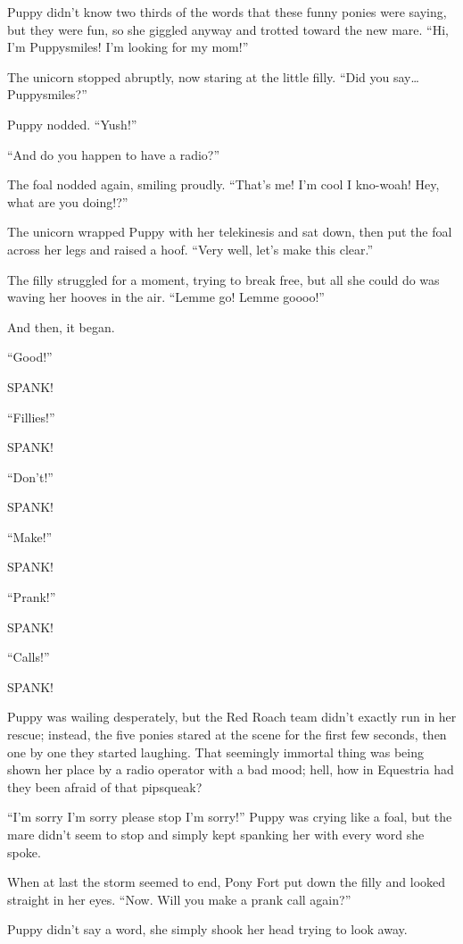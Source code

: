 Puppy didn't know two thirds of the words that these funny ponies were saying, but they were fun, so she giggled anyway and trotted toward the new mare. ``Hi, I'm Puppysmiles! I'm looking for my mom!''

The unicorn stopped abruptly, now staring at the little filly. ``Did you say\dots Puppysmiles?''

Puppy nodded. ``Yush!''

``And do you happen to have a radio?''

The foal nodded again, smiling proudly. ``That's me! I'm cool I kno-woah! Hey, what are you doing!?''

The unicorn wrapped Puppy with her telekinesis and sat down, then put the foal across her legs and raised a hoof. ``Very well, let's make this clear.''

The filly struggled for a moment, trying to break free, but all she could do was waving her hooves in the air. ``Lemme go! Lemme goooo!''

And then, it began.

``Good!''

SPANK!

``Fillies!''

SPANK!

``Don't!''

SPANK!

``Make!''

SPANK!

``Prank!''

SPANK!

``Calls!''

SPANK!

Puppy was wailing desperately, but the Red Roach team didn't exactly run in her rescue; instead, the five ponies stared at the scene for the first few seconds, then one by one they started laughing. That seemingly immortal thing was being shown her place by a radio operator with a bad mood; hell, how in Equestria had they been afraid of that pipsqueak?

``I'm sorry I'm sorry please stop I'm sorry!'' Puppy was crying like a foal, but the mare didn't seem to stop and simply kept spanking her with every word she spoke.

When at last the storm seemed to end, Pony Fort put down the filly and looked straight in her eyes. ``Now. Will you make a prank call again?''

Puppy didn't say a word, she simply shook her head trying to look away.


